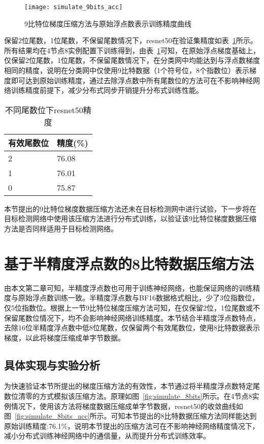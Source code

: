 \begin{figure}[htp]
\centering
\texttt{[image: simulate\_9bits\_acc]}
\caption{9比特位梯度压缩方法与原始浮点数表示训练精度曲线}
\label{fig:simulate_9bits_acc}
\end{figure}

保留2位尾数，1位尾数，不保留尾数情况下，resnet50在验证集精度如表~\ref{tab:simulate_11_10_9bits_acc}所示。所有结果均在4节点8实例配置下训练得到，由表~\ref{tab:simulate_11_10_9bits_acc}可知，在原始浮点梯度基础上，仅保留2位尾数，1位尾数，不保留尾数情况下，在分类网中均能达到与浮点数梯度相同的精度，说明在分类网中仅使用9比特数据（1个符号位，8个指数位）表示梯度即可达到原始训练精度，通过去除浮点数中所有尾数位的方法可在不影响神经网络训练精度前提下，减少分布式同步开销提升分布式训练性能。

\begin{table}[htb]
\centering
\noindent\begin{minipage}{0.45\textwidth}
\centering
\caption{不同尾数位下resnet50精度}
\label{tab:simulate_11_10_9bits_acc}
\begin{tabular}{p{2cm}p{2cm}}
\toprule[1.5pt]
有效尾数位 & 精度(\%) \\\midrule[1pt]
2 & 76.08 \\
1 & 76.01 \\
0 & 75.87 \\
\midrule[1pt]
\end{tabular}
\end{minipage}
\end{table}
本节提出的9比特位梯度数据压缩方法还未在目标检测网中进行试验，下一步将在目标检测网络中使用该压缩方法进行分布式训练，以验证该9比特位梯度数据压缩方法是否同样适用于目标检测网络。

\section{基于半精度浮点数的8比特数据压缩方法}
由本文第二章可知，半精度浮点数也可用于训练神经网络，也能保证网络的训练精度与原始浮点数训练一致。半精度浮点数与BF16数据格式相比，少了3位指数位，仅5位指数位。根据上一节9比特位梯度压缩方法可知，在仅保留2位，1位尾数或不保留尾数位情况下，均不会影响神经网络训练精度。本节结合半精度浮点数特点，去除16位半精度浮点数中低8位尾数，仅保留两个有效尾数位，使用8比特数据表示梯度，以此将梯度压缩成单字节数据。
\subsection{具体实现与实验分析}
为快速验证本节所提出的梯度压缩方法的有效性，本节通过将半精度浮点数特定尾数位清零的方式模拟该压缩方法。原理如图~\ref{fig:simulate_8bits}所示。在4节点8实例情况下，使用该方法将梯度数据压缩成单字节数据，resnet50的收敛曲线如图~\ref{fig:simulate_8bits_acc}所示。可知本节提出的8比特数据压缩方法同样能达到原始训练精度:76.1\%，说明本节提出的压缩方法可在不影响神经网络精度情况下，减小分布式训练神经网络中的通信量，从而提升分布式训练效率。

